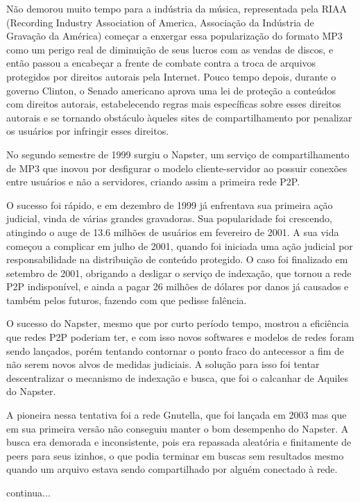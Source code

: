 Não demorou muito tempo para a indústria da música, representada pela RIAA (Recording Industry Association of America, Associação da
Indústria de Gravação da América) começar a enxergar essa popularização do formato MP3 como um perigo real de diminuição de seus lucros com
as vendas de discos, e então passou a encabeçar a frente de combate contra a troca de arquivos protegidos por direitos autorais pela
Internet. Pouco tempo depois, durante o governo Clinton, o Senado americano aprova uma lei de proteção a conteúdos com direitos autorais,
estabelecendo regras mais específicas sobre esses direitos autorais e se tornando obstáculo àqueles sites de compartilhamento por penalizar
os usuários por infringir esses direitos.

No segundo semestre de 1999 surgiu o Napster, um serviço de compartilhamento de MP3 que inovou por desfigurar o modelo cliente-servidor ao
possuir conexões entre usuários e não a servidores, criando assim a primeira rede P2P.

O sucesso foi rápido, e em dezembro de 1999 já enfrentava sua primeira ação judicial, vinda de várias grandes gravadoras. Sua popularidade
foi crescendo, atingindo o auge de 13.6 milhões de usuários em fevereiro de 2001. A sua vida começou a complicar em julho de 2001, quando
foi iniciada uma ação judicial por responsabilidade na distribuição de conteúdo protegido. O caso foi finalizado em setembro de 2001,
obrigando a desligar o serviço de indexação, que tornou a rede P2P indisponível, e ainda a pagar 26 milhões de dólares por danos já
causados e também pelos futuros, fazendo com que pedisse falência.

O sucesso do Napster, mesmo que por curto período tempo, mostrou a eficiência que redes P2P poderiam ter, e com isso novos softwares e
modelos de redes foram sendo lançados, porém tentando contornar o ponto fraco do antecessor a fim de não serem novos alvos de medidas
judiciais. A solução para isso foi tentar descentralizar o mecanismo de indexação e busca, que foi o calcanhar de Aquiles do Napster.

A pioneira nessa tentativa foi a rede Gnutella, que foi lançada em 2003 mas que em sua primeira versão não conseguiu manter o bom
desempenho do Napster. A busca era demorada e inconsistente, pois era repassada aleatória e finitamente de peers para seus izinhos, o que
podia terminar em buscas sem resultados mesmo quando um arquivo estava sendo compartilhado por alguém conectado à rede.

continua...

